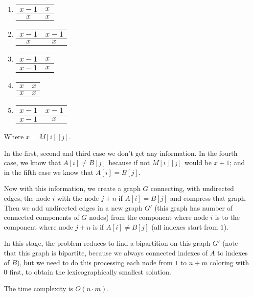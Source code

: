 \begin{enumerate}
    \item
        \begin{tabular}{|c|c|}
            \hline
            $x - 1$ & $x$ \\ \hline
            $x$ & $x$ \\ \hline
        \end{tabular}

    \item
        \begin{tabular}{|c|c|}
            \hline
            $x - 1$ & $x - 1$ \\ \hline
            $x$ & $x$ \\ \hline
        \end{tabular}

    \item
        \begin{tabular}{|c|c|}
            \hline
            $x - 1$ & $x$ \\ \hline
            $x - 1$ & $x$ \\ \hline
        \end{tabular}

    \item
        \begin{tabular}{|c|c|}
            \hline
            $x$ & $x$ \\ \hline
            $x$ & $x$ \\ \hline
        \end{tabular}

    \item
        \begin{tabular}{|c|c|}
            \hline
            $x - 1$ & $x - 1$ \\ \hline
            $x - 1$ & $x$ \\ \hline
        \end{tabular}
\end{enumerate}

Where $x = M[i][j]$.

In the first, second and third case we don't get any information. In the fourth
case, we know that $A[i] \neq B[j]$ because if not $M[i][j]$ would be $x + 1$;
and in the fifth case we know that $A[i] = B[j]$.

Now with this information, we create a graph $G$ connecting, with undirected
edges, the node $i$ with the node $j + n$ if $A[i] = B[j]$ and compress that
graph. Then we add undirected edges in a new graph $G'$ (this graph has number of
connected components of $G$ nodes) from the component where node $i$ is to the
component where node $j + n$ is if $A[i] \neq B[j]$ (all indexes start from 1).

In this stage, the problem reduces to find a bipartition on this graph $G'$
(note that this graph is bipartite, because we always connected indexes of $A$
to indexes of $B$), but we need to do this processing each node from $1$ to $n
+ m$ coloring with $0$ first, to obtain the lexicographically smallest
solution.

The time complexity is $O(n \cdot m)$.
